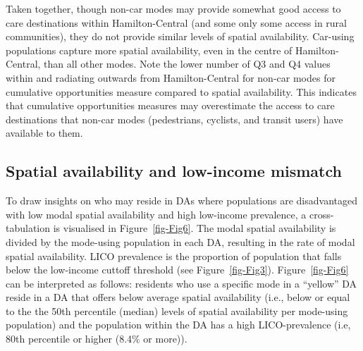 \documentclass[
  authoryear,
  preprint,
  3p]{elsarticle}
\begin{document}
Taken together, though non-car modes may provide somewhat good access to
care destinations within Hamilton-Central (and some only some access in
rural communities), they do not provide similar levels of spatial
availability. Car-using populations capture more spatial availability,
even in the centre of Hamilton-Central, than all other modes. Note the
lower number of Q3 and Q4 values within and radiating outwards from
Hamilton-Central for non-car modes for cumulative opportunities measure
compared to spatial availability. This indicates that cumulative
opportunities measures may overestimate the access to care destinations
that non-car modes (pedestrians, cyclists, and transit users) have
available to them.

\subsection{Spatial availability and low-income
mismatch}\label{spatial-availability-and-low-income-mismatch}

To draw insights on who may reside in DAs where populations are
disadvantaged with low modal spatial availability and high low-income
prevalence, a cross-tabulation is visualised in Figure~\ref{fig-Fig6}.
The modal spatial availability is divided by the mode-using population
in each DA, resulting in the rate of modal spatial availability. LICO
prevalence is the proportion of population that falls below the
low-income cuttoff threshold (see Figure~\ref{fig-Fig3}).
Figure~\ref{fig-Fig6} can be interpreted as follows: residents who use a
specific mode in a ``yellow'' DA reside in a DA that offers below
average spatial availability (i.e., below or equal to the the 50th
percentile (median) levels of spatial availability per mode-using
population) and the population within the DA has a high LICO-prevalence
(i.e, 80th percentile or higher (8.4\% or more)).
\end{document}
